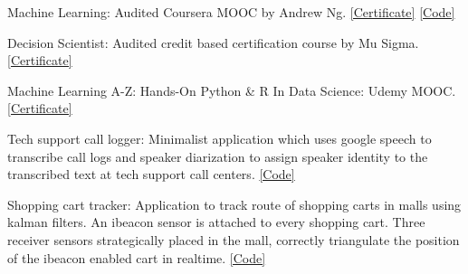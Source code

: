 \documentclass[10pt,a4paper]{article}
\begin{document}
\spacedhrule{1.6em}{-0.4em}



\inlineheadsection
  {Machine Learning:}
  {Audited Coursera MOOC by Andrew Ng. \href{https://www.coursera.org/account/accomplishments/certificate/6UDGCV3A6A7L?utm_medium=certificate&utm_source=link&utm_campaign=copybutton_certificate}{[Certificate]}
\href{https://github.com/praths007/coursera_machine_learning}{[Code]}}

\vspace{0.5em}

\inlineheadsection
  {Decision Scientist:}
  {Audited credit based certification course by Mu Sigma. \href{https://www.portal.mu-sigma.com/msu/DecisionScientistCertificate/8388-Jun2017-10390.html}{[Certificate]}}

\vspace{0.5em}

\inlineheadsection
  {Machine Learning A-Z: Hands-On Python \& R In Data Science:}
  {Udemy MOOC. \href{https://www.udemy.com/certificate/UC-PXVDG31R/}{[Certificate]}}

\spacedhrule{1.6em}{-0.4em}



\inlineheadsection
  {Tech support call logger:}
  {Minimalist application which uses google speech  to transcribe call logs and  speaker diarization to assign speaker identity to the transcribed text at tech support call centers. \href{https://github.com/praths007/speechtotext/}{[Code]}}

\vspace{0.5em}

\inlineheadsection
  {Shopping cart tracker:}
  {Application to track route of shopping carts in malls using kalman filters. An ibeacon sensor is attached to every shopping cart. Three receiver sensors strategically placed in the mall, correctly triangulate the position of the ibeacon enabled cart in realtime. \href{https://github.com/praths007/iot_tracking_shopping_carts/}{[Code]}}
\end{document}
